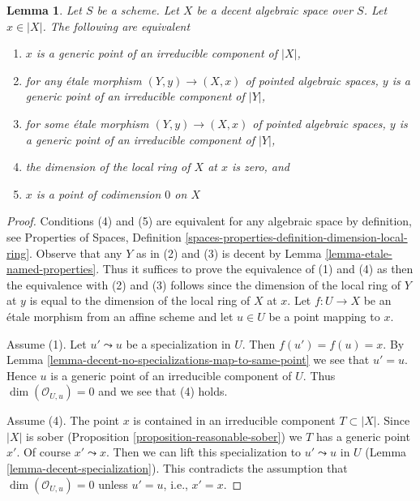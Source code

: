 \documentclass{stacks-project}
\theoremstyle{plain}
\newtheorem{lemma}[subsection]{Lemma}
\theoremstyle{definition}
\theoremstyle{remark}
\numberwithin{equation}{subsection}
\begin{document}
\begin{lemma}
\label{lemma-decent-generic-points}
Let $S$ be a scheme. Let $X$ be a decent algebraic space over $S$.
Let $x \in |X|$. The following are equivalent
\begin{enumerate}
\item $x$ is a generic point of an irreducible component of $|X|$,
\item for any \'etale morphism $(Y, y) \to (X, x)$ of pointed algebraic
spaces, $y$ is a generic point of an irreducible component of $|Y|$,
\item for some \'etale morphism $(Y, y) \to (X, x)$ of pointed algebraic
spaces, $y$ is a generic point of an irreducible component of $|Y|$,
\item the dimension of the local ring of $X$ at $x$ is zero, and
\item $x$ is a point of codimension $0$ on $X$
\end{enumerate}
\end{lemma}

\begin{proof}
Conditions (4) and (5) are equivalent for any algebraic space
by definition, see Properties of Spaces, Definition
\ref{spaces-properties-definition-dimension-local-ring}.
Observe that any $Y$ as in (2) and (3) is decent by
Lemma \ref{lemma-etale-named-properties}.
Thus it suffices to prove the equivalence of (1) and (4)
as then the equivalence with (2) and (3) follows since the dimension
of the local ring of $Y$ at $y$ is equal to the dimension
of the local ring of $X$ at $x$.
Let $f : U \to X$ be an \'etale morphism from an affine scheme and let
$u \in U$ be a point mapping to $x$.

\medskip\noindent
Assume (1). Let $u' \leadsto u$ be a specialization in $U$.
Then $f(u') = f(u) = x$. By
Lemma \ref{lemma-decent-no-specializations-map-to-same-point}
we see that $u' = u$. Hence $u$ is a generic point of an irreducible component
of $U$. Thus $\dim(\mathcal{O}_{U, u}) = 0$ and we see that (4) holds.

\medskip\noindent
Assume (4). The point $x$ is contained in an irreducible component
$T \subset |X|$. Since $|X|$ is sober
(Proposition \ref{proposition-reasonable-sober})
we $T$ has a generic point $x'$. Of course $x' \leadsto x$.
Then we can lift this specialization to $u' \leadsto u$ in $U$
(Lemma \ref{lemma-decent-specialization}). This contradicts the assumption
that $\dim(\mathcal{O}_{U, u}) = 0$ unless $u' = u$, i.e., $x' = x$.
\end{proof}
\end{document}

